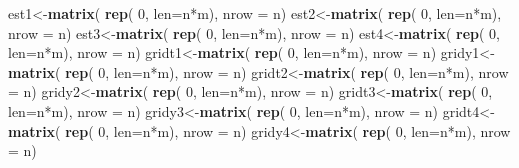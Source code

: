 \documentclass[12pt,twoside, a4paper]{reedthesis}
\newenvironment{Shaded}{}{}
\newcommand{\DataTypeTok}[1]{\textcolor[rgb]{0.56,0.13,0.00}{#1}}
\newcommand{\DecValTok}[1]{\textcolor[rgb]{0.25,0.63,0.44}{#1}}
\newcommand{\KeywordTok}[1]{\textcolor[rgb]{0.00,0.44,0.13}{\textbf{#1}}}
\newcommand{\NormalTok}[1]{#1}
\newcommand{\OperatorTok}[1]{\textcolor[rgb]{0.40,0.40,0.40}{#1}}
\begin{document}
\begin{Shaded}
\begin{Highlighting}[]
\NormalTok{  est1<-}\KeywordTok{matrix}\NormalTok{( }\KeywordTok{rep}\NormalTok{( }\DecValTok{0}\NormalTok{, }\DataTypeTok{len=}\NormalTok{n}\OperatorTok{*}\NormalTok{m), }\DataTypeTok{nrow =}\NormalTok{ n)}
\NormalTok{  est2<-}\KeywordTok{matrix}\NormalTok{( }\KeywordTok{rep}\NormalTok{( }\DecValTok{0}\NormalTok{, }\DataTypeTok{len=}\NormalTok{n}\OperatorTok{*}\NormalTok{m), }\DataTypeTok{nrow =}\NormalTok{ n)}
\NormalTok{  est3<-}\KeywordTok{matrix}\NormalTok{( }\KeywordTok{rep}\NormalTok{( }\DecValTok{0}\NormalTok{, }\DataTypeTok{len=}\NormalTok{n}\OperatorTok{*}\NormalTok{m), }\DataTypeTok{nrow =}\NormalTok{ n)}
\NormalTok{  est4<-}\KeywordTok{matrix}\NormalTok{( }\KeywordTok{rep}\NormalTok{( }\DecValTok{0}\NormalTok{, }\DataTypeTok{len=}\NormalTok{n}\OperatorTok{*}\NormalTok{m), }\DataTypeTok{nrow =}\NormalTok{ n)}
\NormalTok{  gridt1<-}\KeywordTok{matrix}\NormalTok{( }\KeywordTok{rep}\NormalTok{( }\DecValTok{0}\NormalTok{, }\DataTypeTok{len=}\NormalTok{n}\OperatorTok{*}\NormalTok{m), }\DataTypeTok{nrow =}\NormalTok{ n)}
\NormalTok{  gridy1<-}\KeywordTok{matrix}\NormalTok{( }\KeywordTok{rep}\NormalTok{( }\DecValTok{0}\NormalTok{, }\DataTypeTok{len=}\NormalTok{n}\OperatorTok{*}\NormalTok{m), }\DataTypeTok{nrow =}\NormalTok{ n)}
\NormalTok{  gridt2<-}\KeywordTok{matrix}\NormalTok{( }\KeywordTok{rep}\NormalTok{( }\DecValTok{0}\NormalTok{, }\DataTypeTok{len=}\NormalTok{n}\OperatorTok{*}\NormalTok{m), }\DataTypeTok{nrow =}\NormalTok{ n)}
\NormalTok{  gridy2<-}\KeywordTok{matrix}\NormalTok{( }\KeywordTok{rep}\NormalTok{( }\DecValTok{0}\NormalTok{, }\DataTypeTok{len=}\NormalTok{n}\OperatorTok{*}\NormalTok{m), }\DataTypeTok{nrow =}\NormalTok{ n)}
\NormalTok{  gridt3<-}\KeywordTok{matrix}\NormalTok{( }\KeywordTok{rep}\NormalTok{( }\DecValTok{0}\NormalTok{, }\DataTypeTok{len=}\NormalTok{n}\OperatorTok{*}\NormalTok{m), }\DataTypeTok{nrow =}\NormalTok{ n)}
\NormalTok{  gridy3<-}\KeywordTok{matrix}\NormalTok{( }\KeywordTok{rep}\NormalTok{( }\DecValTok{0}\NormalTok{, }\DataTypeTok{len=}\NormalTok{n}\OperatorTok{*}\NormalTok{m), }\DataTypeTok{nrow =}\NormalTok{ n)}
\NormalTok{  gridt4<-}\KeywordTok{matrix}\NormalTok{( }\KeywordTok{rep}\NormalTok{( }\DecValTok{0}\NormalTok{, }\DataTypeTok{len=}\NormalTok{n}\OperatorTok{*}\NormalTok{m), }\DataTypeTok{nrow =}\NormalTok{ n)}
\NormalTok{  gridy4<-}\KeywordTok{matrix}\NormalTok{( }\KeywordTok{rep}\NormalTok{( }\DecValTok{0}\NormalTok{, }\DataTypeTok{len=}\NormalTok{n}\OperatorTok{*}\NormalTok{m), }\DataTypeTok{nrow =}\NormalTok{ n)}
  

\end{Highlighting}
\end{Shaded}
\end{document}
